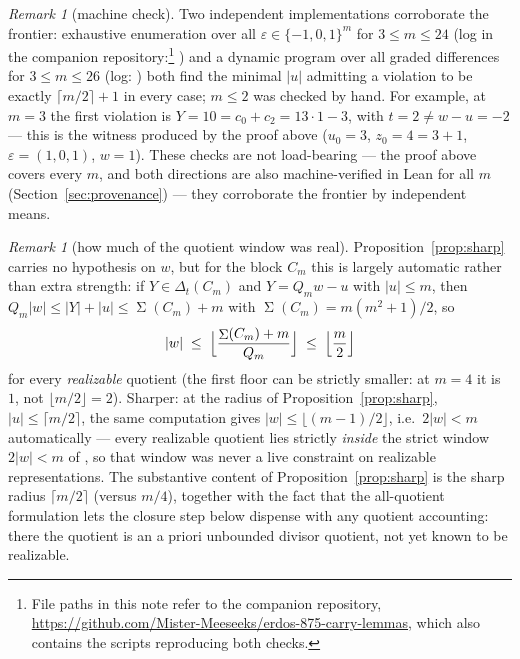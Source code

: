 \documentclass[11pt]{article}
\theoremstyle{definition}
\theoremstyle{remark}
\newtheorem{remark}[lemma]{Remark}
\DeclareMathOperator{\SSum}{\Sigma}
\begin{document}
\begin{remark}[machine check]\label{rem:machine}
Two independent implementations corroborate the frontier: exhaustive
enumeration over all $\varepsilon\in\{-1,0,1\}^m$ for $3\le m\le24$ (log
in the companion repository:\footnote{File paths in this note refer to
the companion repository,
\url{https://github.com/Mister-Meeseeks/erdos-875-carry-lemmas},
which also contains the scripts reproducing both checks.}
) and
a dynamic program over all graded differences for $3\le m\le26$
(log: ) both find the
minimal $|u|$ admitting a violation to be exactly $\lceil m/2\rceil+1$
in every case; $m\le2$ was checked by hand. For
example, at $m=3$ the first violation is $Y=10=c_0+c_2=13\cdot1-3$, with
$t=2\ne w-u=-2$ --- this is the witness produced by the proof above
($u_0=3$, $z_0=4=3+1$, $\varepsilon=(1,0,1)$, $w=1$). These checks are
not load-bearing --- the proof above covers every $m$, and both
directions are also machine-verified in Lean for all $m$
(Section~\ref{sec:provenance}) --- they corroborate the frontier by
independent means.
\end{remark}

\begin{remark}[how much of the quotient window was real]\label{rem:autow}
Proposition~\ref{prop:sharp} carries no hypothesis on $w$, but for the
block $C_m$ this is largely automatic rather than extra strength: if
$Y\in\Delta_t(C_m)$ and $Y=Q_mw-u$ with $|u|\le m$, then
$Q_m|w|\le|Y|+|u|\le\SSum(C_m)+m$ with $\SSum(C_m)=m(m^2+1)/2$, so
\[
|w|\;\le\;\Bigl\lfloor\frac{\SSum(C_m)+m}{Q_m}\Bigr\rfloor
\;\le\;\Bigl\lfloor\frac{m}{2}\Bigr\rfloor
\]
for every \emph{realizable} quotient (the first floor can be strictly
smaller: at $m=4$ it is $1$, not $\lfloor m/2\rfloor=2$). Sharper: at the
radius of Proposition~\ref{prop:sharp}, $|u|\le\lceil m/2\rceil$, the
same computation gives $|w|\le\lfloor(m-1)/2\rfloor$, i.e.\ $2|w|<m$
automatically --- every realizable quotient lies strictly \emph{inside}
the strict window $2|w|<m$ of \cite[Lemma~2]{Mazur26}, so that window was
never a live constraint on realizable representations. The substantive
content of Proposition~\ref{prop:sharp} is the sharp radius
$\lceil m/2\rceil$ (versus $m/4$), together with the fact that the
all-quotient formulation lets the closure step below dispense with any
quotient accounting: there the quotient is an a priori unbounded divisor
quotient, not yet known to be realizable.
\end{remark}
\end{document}
